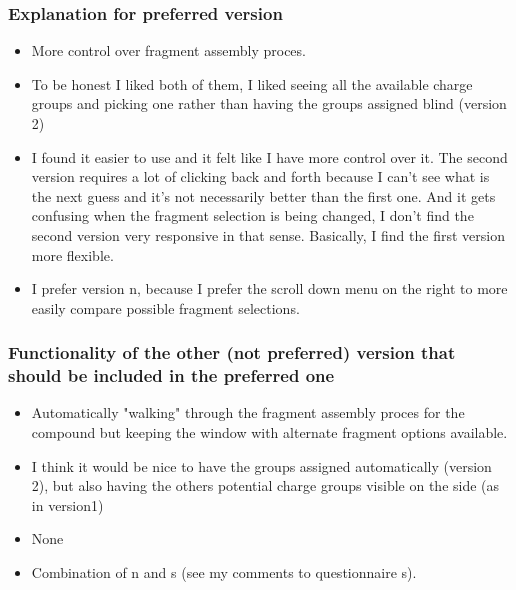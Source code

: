\subsubsection{Explanation for preferred version}
\begin{itemize}
\item More control over fragment assembly proces. 

\item To be honest I liked both of them, I liked seeing all the available charge groups and picking one rather than having the groups assigned blind (version 2)

\item I found it easier to use and it felt like I have more control over it. The second version requires a lot of clicking back and forth because I can't see what is the next guess and it's not necessarily better than the first one. And it gets confusing when the fragment selection is being changed, I don't find the second version very responsive in that sense. Basically, I find the first version more flexible.

\item I prefer version n, because I prefer the scroll down menu on the right to more easily compare possible fragment selections.

\end{itemize}


\subsubsection{Functionality of the other (not preferred) version that should be included in the preferred one}
\begin{itemize}
\item Automatically "walking" through the fragment assembly proces for the compound but keeping the window with alternate fragment options available. 

\item I think it would be nice to have the groups assigned automatically (version 2), but also having the others potential charge groups visible on the side (as in version1)

\item None

\item Combination of n and s (see my comments to questionnaire s).

\end{itemize}


